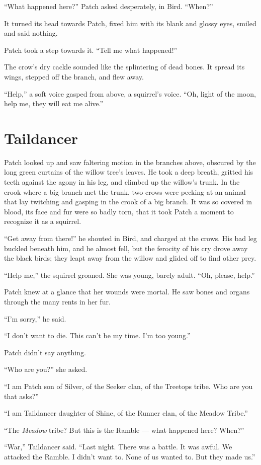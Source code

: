 \documentclass[ebook,oneside,openany,17pt]{memoir}
\renewcommand{\thechapter}{\Roman{chapter}}
\newcounter{sections}
\newcommand{\sections}[1]{%
  \section*{#1}
  \addtocounter{sections}{1}%
  \pdfbookmark[1]{#1}{section.\thechapter.\thesections}}
\begin{document}
“What happened here?” Patch asked desperately, in Bird. “When?”

It turned its head towards Patch, fixed him with its blank and glossy
eyes, smiled and said nothing.

Patch took a step towards it. “Tell me what happened!”

The crow’s dry cackle sounded like the splintering of dead bones. It
spread its wings, stepped off the branch, and flew away.

“Help,” a soft voice gasped from above, a squirrel’s voice. “Oh, light
of the moon, help me, they will eat me alive.”


\sections{Taildancer}

Patch looked up and saw faltering motion in the branches above,
obscured by the long green curtains of the willow tree’s leaves. He
took a deep breath, gritted his teeth against the agony in his leg,
and climbed up the willow’s trunk. In the crook where a big branch met
the trunk, two crows were pecking at an animal that lay twitching and
gasping in the crook of a big branch. It was so covered in blood, its
face and fur were so badly torn, that it took Patch a moment to
recognize it as a squirrel.

“Get away from there!” he shouted in Bird, and charged at the
crows. His bad leg buckled beneath him, and he almost fell, but the
ferocity of his cry drove away the black birds; they leapt away from
the willow and glided off to find other prey.

“Help me,” the squirrel groaned. She was young, barely adult. “Oh,
please, help.”

Patch knew at a glance that her wounds were mortal. He saw bones and
organs through the many rents in her fur.

“I’m sorry,” he said.

“I don’t want to die. This can’t be my time. I’m too young.”

Patch didn’t say anything.

“Who are you?” she asked.

“I am Patch son of Silver, of the Seeker clan, of the Treetops
tribe. Who are you that asks?”

“I am Taildancer daughter of Shine, of the Runner clan, of the Meadow
Tribe.”

“The \emph{Meadow} tribe? But this is the Ramble — what happened
here? When?”

“War,” Taildancer said. “Last night. There was a battle. It was
awful. We attacked the Ramble. I didn’t want to. None of us wanted
to. But they made us.”
\end{document}
